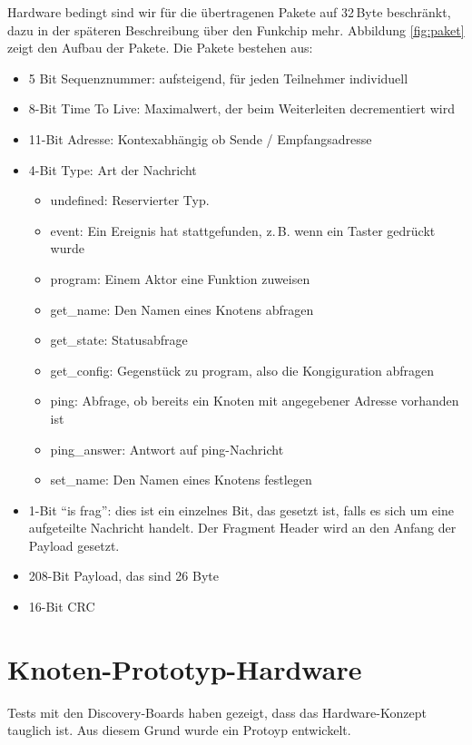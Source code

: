 \documentclass{IEEEtran}
\begin{document}
        Hardware bedingt sind wir für die übertragenen Pakete auf 32\,Byte 
        beschränkt, dazu in der späteren Beschreibung über den Funkchip mehr. 
        Abbildung \ref{fig:paket} zeigt den Aufbau der Pakete. Die Pakete 
        bestehen aus:
        \begin{itemize}
            \item 5 Bit Sequenznummer: aufsteigend, für jeden Teilnehmer individuell
            \item 8-Bit Time To Live: Maximalwert, der beim Weiterleiten decrementiert wird
            \item 11-Bit Adresse: Kontexabhängig ob Sende / Empfangsadresse
            \item 4-Bit Type: Art der Nachricht
            \begin{itemize}
                \item undefined: Reservierter Typ.
                \item event: Ein Ereignis hat stattgefunden, z.\,B. wenn ein Taster gedrückt wurde
                \item program: Einem Aktor eine Funktion zuweisen
                \item get\_name: Den Namen eines Knotens abfragen
                \item get\_state: Statusabfrage
                \item get\_config: Gegenstück zu program, also die Kongiguration abfragen
                \item ping: Abfrage, ob bereits ein Knoten mit angegebener Adresse vorhanden ist
                \item ping\_answer: Antwort auf ping-Nachricht
                \item set\_name: Den Namen eines Knotens festlegen
            \end{itemize}
            \item 1-Bit \enquote{is frag}: dies ist ein einzelnes Bit, das gesetzt ist, falls es sich um eine aufgeteilte Nachricht handelt. Der Fragment Header wird an den Anfang der Payload gesetzt.
            \item 208-Bit Payload, das sind 26 Byte
            \item 16-Bit CRC
        \end{itemize}

\section{Knoten-Prototyp-Hardware}
Tests mit den Discovery-Boards haben gezeigt, dass das Hardware-Konzept tauglich ist.
Aus diesem Grund wurde ein Protoyp entwickelt. 
\end{document}
